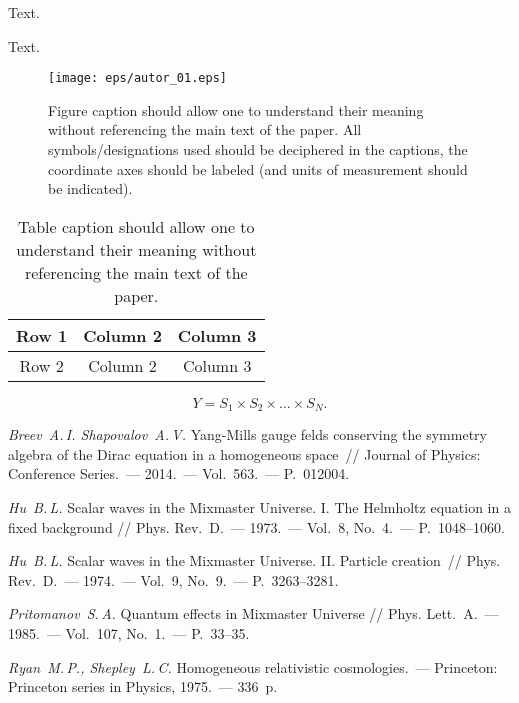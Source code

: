 \documentclass{crm-article}
\begin{document}
\begin{exl}
Text.
\end{exl}

\begin{sol}
Text.
\end{sol}


\begin{figure}[!ht]
\centering
\texttt{[image: eps/autor\_01.eps]}
\smallskip
\caption{Figure caption should allow one to understand their meaning without referencing the main text of the paper. All symbols/designations used should be deciphered in the captions, the coordinate axes should be labeled (and units of measurement should be indicated).}
\end{figure}


\begin{table}[!ht]
\centering
\caption{Table caption should allow one to understand their meaning without referencing the main text of the paper.}
\medskip
\begin{tabular}{|c|c|c|}
\hline
Row 1 & Column 2 & Column 3\\
\hline
Row 2& Column 2 & Column 3\\
\hline
\end{tabular}
\end{table}


$$
Y= S_1\times S_2\times \ldots \times S_N.
$$


	
\begin{thebibliography}{99}

 {\it Breev~A.\,I. Shapovalov~A.\,V.}
    Yang-Mills gauge felds conserving the symmetry algebra of the
    Dirac equation in a homogeneous space~// Journal of Physics:
    Conference Series.~--- 2014.~--- Vol.~563.~--- P.~012004.

 {\it Hu~B.\,L.} Scalar waves in the Mixmaster
    Universe. I. The Helmholtz equation in a fixed background //
    Phys. Rev.~D.~--- 1973.~--- Vol.~{8}, No.~4.~--- P.~1048--1060.

 {\it Hu~B.\,L.} Scalar waves in the Mixmaster
    Universe. II. Particle creation~// Phys. Rev.~D.~--- 1974.~--- Vol.~9, No.~9.~--- P.~3263--3281.

 {\it Pritomanov~S.\,A.} Quantum
    effects in Mixmaster Universe // Phys. Lett.~A.~--- 1985.~--- Vol.~107, No.~1.~--- P.~33--35.

 {\it Ryan~M.\,P., Shepley~L.\,C.}
    Homogeneous relativistic cosmologies.~--- Princeton: Princeton
    series in Physics, 1975.~--- 336~p.

\end{thebibliography}
\end{document}

